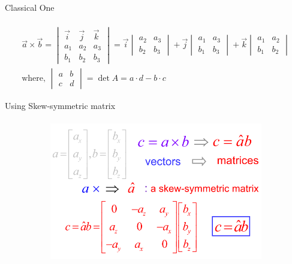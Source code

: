 \documentclass[aspectratio=169,notes]{beamer}
\begin{document}
\begin{frame}[t]{Classical One}
\framesubtitle{}
    \begin{align*}
        \vec{a} \times \vec{b} = \begin{vmatrix}
            \vec{i} & \vec{j} & \vec{k}\\ 
            a_{1} & a_{2} & a_{3}\\
            b_{1} & b_{2} & b_{3} 
       \end{vmatrix} = \vec{i}\begin{vmatrix} a_{2} & a_{3} \\ b_{2} & b_{3} \end{vmatrix} + 
       \vec{j}\begin{vmatrix} a_{1} & a_{3} \\ b_{1} & b_{3} \end{vmatrix} +
       \vec{k}\begin{vmatrix} a_{1} & a_{2} \\ b_{1} & b_{2} \end{vmatrix} \\
       \text{where, } \begin{vmatrix} a & b \\ c & d \end{vmatrix} = \det A = a \cdot d - b \cdot c
    \end{align*}
\end{frame}

\begin{frame}[t]{Using Skew-symmetric matrix}
\framesubtitle{}
    \vspace{-0.6cm}
    \begin{figure}[H]
        \centering\includegraphics[height=6cm,width=1\textwidth,keepaspectratio]{resources/image13.png}
        \label{fig:resources/image13.png}
    \end{figure}
\end{frame}
\end{document}
